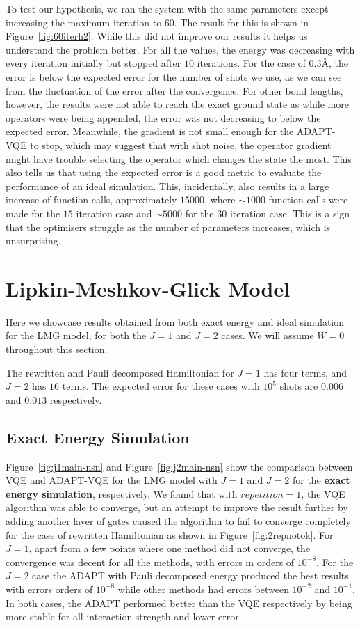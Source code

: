 To test our hypothesis, we ran the system with the same parameters except increasing the maximum iteration to $ 60 $. The result for this is shown in Figure~\ref{fig:60iterh2}. While this did not improve our results it helps us understand the problem better. For all the values, the energy was decreasing with every iteration initially but stopped after $ 10 $ iterations. For the case of $ 0.3 \text{Å} $, the error is below the expected error for the number of shots we use, as we can see from the fluctuation of the error after the convergence. For other bond lengths, however, the results were not able to reach the exact ground state as while more operators were being appended, the error was not decreasing to below the expected error. Meanwhile, the gradient is not small enough for the ADAPT-VQE to stop, which may suggest that with shot noise, the operator gradient might have trouble selecting the operator which changes the state the most. This also tells us that using the expected error is a good metric to evaluate the performance of an ideal simulation. This, incidentally, also results in a large increase of function calls, approximately $ 15000 $, where $ \sim 1000 $ function calls were made for the $ 15 $ iteration case and $ \sim 5000 $ for the $ 30 $ iteration case. This is a sign that the optimisers struggle as the number of parameters increases, which is unsurprising. 

\section{Lipkin-Meshkov-Glick Model}
\label{sec:LMG_result}
Here we showcase results obtained from both exact energy and ideal simulation for the LMG model, for both the $ J=1 $ and $ J=2 $ cases. We will assume $ W=0 $ throughout this section. 

The rewritten and Pauli decomposed Hamiltonian for $ J=1 $ has four terms, and $ J=2 $ has $ 16 $ terms. The expected error for these cases with $ 10^5 $ shots are $ 0.006 $ and $ 0.013 $ respectively. 


\subsection{Exact Energy Simulation}
Figure~\ref{fig:j1main-nsn} and Figure~\ref{fig:j2main-nsn} show the comparison between VQE and ADAPT-VQE for the LMG model with $ J=1 $ and $ J=2 $ for the \textbf{exact energy simulation}, respectively. We found that with $ repetition=1 $, the VQE algorithm was able to converge, but an attempt to improve the result further by adding another layer of gates caused the algorithm to fail to converge completely for the case of rewritten Hamiltonian as shown in Figure~\ref{fig:2repnotok}. For $ J=1 $, apart from a few points where one method did not converge, the convergence was decent for all the methods, with errors in orders of $ 10^{-8} $.  For the $ J=2 $ case the ADAPT with Pauli decomposed energy produced the best results with errors orders of $ 10^{-8} $ while other methods had errors between $ 10^{-2} $ and $ 10^{-1} $. In both cases, the ADAPT performed better than the VQE respectively by being more stable for all interaction strength and lower error. 


